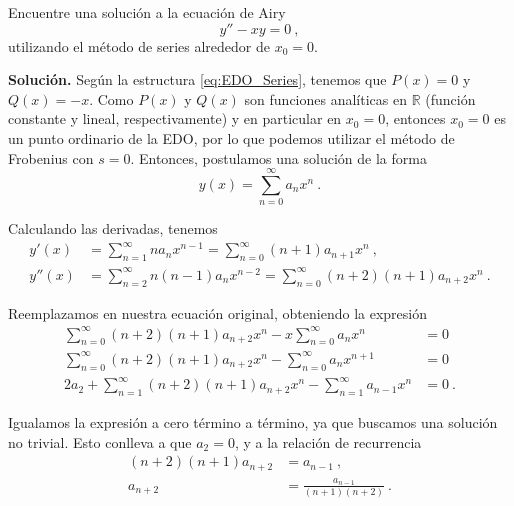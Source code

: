 \begin{ejemplo}
    Encuentre una solución a la ecuación de Airy
    \begin{equation}
        y'' - xy = 0 \ ,
    \end{equation}
    utilizando el método de series alrededor de $x_0 = 0$.

    \textbf{Solución.} Según la estructura \eqref{eq:EDO_Series}, tenemos que $P(x) = 0$ y $Q(x) = -x$. Como $P(x)$ y $Q(x)$ son funciones analíticas en $\mathbb{R}$ (función constante y lineal, respectivamente) y en particular en $x_0 = 0$, entonces $x_0 = 0$ es un punto ordinario de la EDO, por lo que podemos utilizar el método de Frobenius con $s=0$. Entonces, postulamos una solución de la forma
    \begin{equation}
        y(x) = \sum_{n=0}^\infty a_n x^n \ .
    \end{equation}

    Calculando las derivadas, tenemos
    \begin{align}
        y'(x)  & = \sum_{n=1}^\infty na_n x^{n-1} = \sum_{n=0}^\infty (n+1) a_{n+1} x^n \ , \\
        y''(x) & = \sum_{n=2}^\infty n(n-1) a_n x^{n-2} = \sum_{n=0}^\infty (n+2) (n+1) a_{n+2} x^n \ .
    \end{align}

    Reemplazamos en nuestra ecuación original, obteniendo la expresión 
    \begin{align}
        \sum_{n=0}^\infty (n+2) (n+1) a_{n+2} x^n - x \sum_{n=0}^\infty a_n x^n & = 0 \\
        \sum_{n=0}^\infty (n+2) (n+1) a_{n+2} x^n - \sum_{n=0}^\infty a_n x^{n+1} & = 0 \\
        2a_2 + \sum_{n=1}^\infty (n+2) (n+1) a_{n+2} x^n - \sum_{n=1}^\infty a_{n-1} x^{n} & = 0 \ .
    \end{align}

    Igualamos la expresión a cero término a término, ya que buscamos una solución no trivial. Esto conlleva a que $a_2 = 0$, y a la relación de recurrencia
    \begin{align}
        (n+2)(n+1) a_{n+2} & = a_{n-1} \ , \\
        a_{n+2} & = \frac{a_{n-1}}{(n+1)(n+2)} \ .
    \end{align}


\end{ejemplo}
